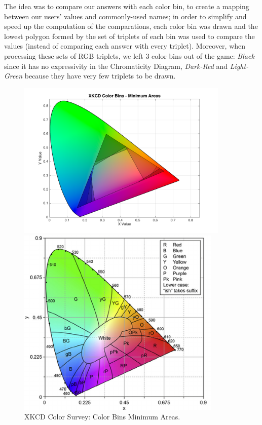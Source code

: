 %
The idea was to compare our answers with each color bin, to create a mapping between our users' values and commonly-used names; in order to simplify and speed up the computation
of the comparations, each color bin was drawn and the lowest polygon formed by the set of triplets of each bin was used to compare the values (instead of comparing each answer
with every triplet). Moreover, when processing these sets of RGB triplets, we left 3 color bins out of the game: \emph{Black} since it has no expressivity in the Chromaticity Diagram,
\emph{Dark-Red} and \emph{Light-Green} because they have very few triplets to be drawn. \par
%
\begin{figure}
  \centering
  \begin{minipage}{0.54\textwidth}
    \centering
    \includegraphics[width=0.9\textwidth]{images/colorbins_areas.png}
    \caption[XKCD Color Survey: Color Bins Minimum Areas]{XKCD Color Survey: Color Bins Minimum Areas.}
    \label{fig:colorbins_areas}
  \end{minipage}\hfill
  \begin{minipage}{0.45\textwidth}
    \centering
    \includegraphics[width=0.87\textwidth]{images/cie_colors.png}

\end{minipage}
\end{figure}
